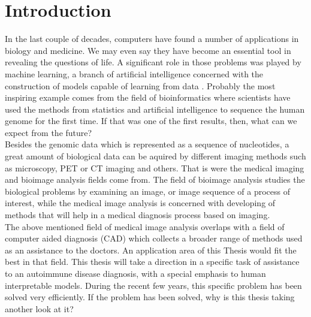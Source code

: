 

\chapter{Introduction} 

\label{Chapter1} 



In the last couple of decades, computers  have found a number of applications in biology and medicine. We may even say they have become an essential tool in revealing the questions of life. A significant role in those problems was played by machine learning, a branch of artificial intelligence concerned with the construction of models capable of learning from data . Probably the most inspiring example comes from the field of bioinformatics where scientists have used the methods from  statistics and artificial intelligence to sequence the human genome for the first time. If that was one of the first results, then, what can we expect from the future? \\

Besides the genomic data which is represented as a sequence of nucleotides, a great amount of  biological data can be aquired by different imaging methods such as microscopy, PET or CT imaging and others. That is were the medical imaging and bioimage analysis fields come from. The field of bioimage analysis studies the biological problems by examining an image, or image sequence of a process of interest, while the medical image analysis is concerned with developing of methods that will help in a medical diagnosis process based on imaging. \\

The above mentioned field of medical image analysis overlaps with a field of computer aided diagnosis (CAD) which collects a broader range of methods used as an assistance to the doctors. An application area of this Thesis would fit the best in that field. This thesis will take a direction in a specific task of assistance to an autoimmune disease diagnosis, with a special emphasis to human interpretable models. During the recent few years, this specific problem has been solved very efficiently. If the problem has been solved, why is this thesis taking another look at it? \\

